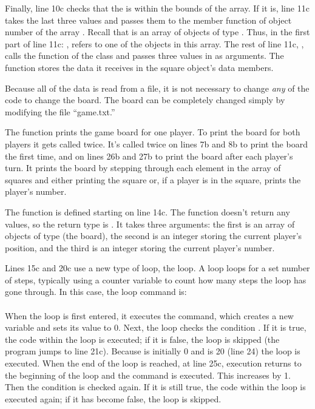 Finally, line 10c checks that the  is within the bounds of the array.  If it is, line 11c takes the last three values and passes them to the  member function of object number  of the array .  Recall that  is an array of objects of type .  Thus, in the first part of line 11c: , refers to one of the objects in this array.  The rest of line 11c, , calls the  function of the class  and passes three values in as arguments.  The  function stores the data it receives in the square object's data members.  

Because all of the data is read from a file, it is not necessary to change \emph{any} of the code to change the board.   The board can be completely changed simply by modifying the file ``game.txt.''


The  function prints the game board for one player.  To print the board for both players it gets called twice.  It's called twice on lines 7b and 8b to print the board the first time, and on lines 26b and 27b to print the board after each player's turn.  It prints the board by stepping through each element in the array of squares and either printing the square or, if a player is in the square, prints the player's number.

The  function is defined starting on line 14c.
The function doesn't return any values, so the return type is .  It takes three arguments: the first is an array of objects of type  (the board), the second is an integer storing the current player's position, and the third is an integer storing the current player's number.

Lines 15c and 20c use a new type of loop, the  loop.  A  loop loops for a set number of steps, typically using a counter variable to count how many steps the loop has gone through.  In this case, the loop command is:\\
\\
When the loop is first entered, it executes the  command, which creates a new variable  and sets its value to 0.  Next, the loop checks the condition .  If it is true, the code within the loop is executed; if it is false, the loop is skipped (the program jumps to line 21c).  Because  is initially 0 and  is 20 (line 24)  the loop is executed.  When the end of the loop is reached, at line 25c, execution returns to the beginning of the loop and the command  is executed.  This increases  by 1.  Then the condition is checked again.  If it is still true, the code within the loop is executed again; if it has become false, the loop is skipped.  

